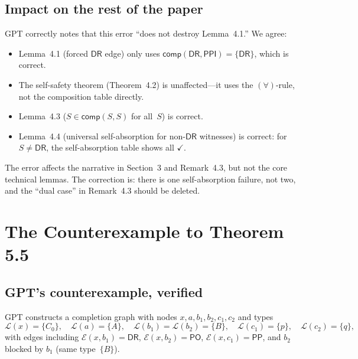 \documentclass[a4paper,11pt]{article}
\theoremstyle{definition}
\newcommand{\DR}{\ensuremath{\mathsf{DR}}}
\newcommand{\PO}{\ensuremath{\mathsf{PO}}}
\newcommand{\PP}{\ensuremath{\mathsf{PP}}}
\newcommand{\PPI}{\ensuremath{\mathsf{PPI}}}
\newcommand{\comp}{\ensuremath{\mathsf{comp}}}
\begin{document}
\subsection{Impact on the rest of the paper}

GPT correctly notes that this error ``does not destroy Lemma~4.1.''
We agree:
\begin{itemize}[nosep]
  \item Lemma~4.1 (forced $\DR$ edge) only uses
    $\comp(\DR, \PPI) = \{\DR\}$, which is correct.
  \item The self-safety theorem (Theorem~4.2) is
    unaffected---it uses the $(\forall)$-rule, not the composition
    table directly.
  \item Lemma~4.3 ($S \in \comp(S,S)$ for all~$S$) is correct.
  \item Lemma~4.4 (universal self-absorption for non-$\DR$ witnesses)
    is correct: for $S \neq \DR$, the self-absorption table shows all
    $\checkmark$.
\end{itemize}

The error affects the narrative in Section~3 and Remark~4.3, but not
the core technical lemmas.  The correction is: there is one
self-absorption failure, not two, and the ``dual case'' in Remark~4.3
should be deleted.


\section{The Counterexample to Theorem 5.5}

\subsection{GPT's counterexample, verified}

GPT constructs a completion graph with nodes $x, a, b_1, b_2, c_1,
c_2$ and types
\[
  \mathcal{L}(x) = \{C_0\}, \quad
  \mathcal{L}(a) = \{A\}, \quad
  \mathcal{L}(b_1) = \mathcal{L}(b_2) = \{B\}, \quad
  \mathcal{L}(c_1) = \{p\}, \quad
  \mathcal{L}(c_2) = \{q\},
\]
with edges including $\mathcal{E}(x, b_1) = \DR$, $\mathcal{E}(x,
b_2) = \PO$, $\mathcal{E}(x, c_1) = \PP$, and $b_2$ blocked by
$b_1$ (same type~$\{B\}$).
\end{document}
